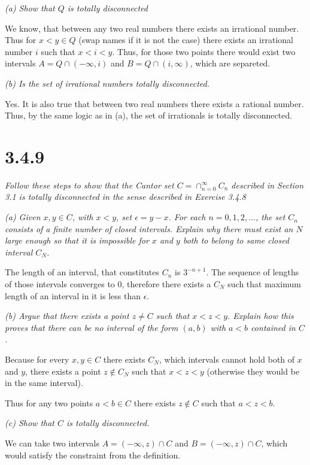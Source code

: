 \documentclass[11pt,oneside,titlepage]{book}
\begin{document}
\textit{(a) Show that $Q$ is totally disconnected}

We know, that between any two real numbers there exists an irrational number.
Thus for $x < y \in Q$ (swap names if it is not the case) there exists
an irrational number $i$ such that $x < i < y$. Thus, for those two points
there would exist two intervals $A = Q \cap (-\infty, i)$ and $B = Q \cap (i, \infty)$, which are separeted.

\textit{(b) Is the set of irrational numbers totally disconnected.}

Yes. It is also true that between two real numbers there exists a rational
number. Thus, by the same logic as in (a), the set of irrationals is totally
disconnected.

\section*{3.4.9}
\textit{Follow these steps to show that the Cantor set
  $C = \cap_{n = 0}^{\infty} C_n $ described in Section 3.1 is totally
  disconnected in the sense described in Exercise 3.4.8}

\textit{(a) Given $x, y \in C$, with $x < y$, set $\epsilon = y - x$. For
  each $n = 0, 1, 2,...$, the set $C_n$ consists of a finite number of closed
  intervals. Explain why there must exist an $N$ large enough so that it is
  impossible for $x$ and $y$ both to belong to same closed interval $C_N$.}

The length of an interval, that constitutes $C_n$ is $3^{-n + 1}$. The sequence
of lengths of those intervals converges to 0, therefore there exists
a $C_N$ such that maximum length of an interval in it is less than $\epsilon$.

\textit{(b) Argue that there exists a point $z \neq C$ such that $x < z < y$.
  Explain how this proves that there can be no interval of the form $(a,b)$
  with $a < b$ contained in $C$.}

Because for every $x, y \in C$ there exists $C_N$,
which intervals  cannot hold both
of $x$ and $y$, there exists a point $z \notin C_N$ such that $x < z < y$
(otherwise they would be in the same interval).

Thus for any two points $a< b \in C$ there exists $z \notin C$ such that
$a < z < b$.

\textit{(c) Show that $C$ is totally disconnected.}

We can take two intervals $A = (-\infty, z) \cap C$ and
$B = (-\infty, z) \cap C$, which would satisfy the constraint from the
definition.
\end{document}
